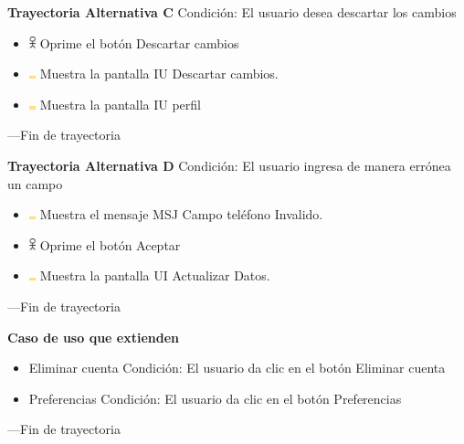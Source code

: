 \vspace{15pt}

\textbf{Trayectoria Alternativa C}
Condición: El usuario desea descartar los cambios

\begin{itemize}
    \item \includegraphics[width=0.0150\textwidth]{Figuras/persona.png} Oprime el botón Descartar cambios
    \item \includegraphics[width=0.01500\textwidth]{Figuras/sistema.png} Muestra la pantalla IU Descartar cambios.
     \item \includegraphics[width=0.01500\textwidth]{Figuras/sistema.png} Muestra la pantalla IU perfil
\end{itemize}
---Fin de trayectoria
\vspace{15pt}


\textbf{Trayectoria Alternativa D}
Condición: El usuario ingresa de manera errónea un campo

\begin{itemize}
    \item \includegraphics[width=0.0150\textwidth]{Figuras/sistema.png} Muestra el mensaje MSJ Campo teléfono Invalido.
    \item \includegraphics[width=0.01500\textwidth]{Figuras/persona.png} Oprime el botón Aceptar
     \item \includegraphics[width=0.01500\textwidth]{Figuras/sistema.png} Muestra la pantalla UI Actualizar Datos.
\end{itemize}
---Fin de trayectoria
\vspace{15pt}

\textbf{Caso de uso que extienden}

\begin{itemize}
    \item Eliminar cuenta
Condición: El usuario da clic en el botón Eliminar cuenta


    \item Preferencias
Condición: El usuario da clic en el botón Preferencias
   
\end{itemize}
---Fin de trayectoria
\vspace{15pt}


